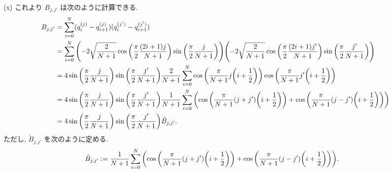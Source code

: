 \documentclass[uplatex,dvipdfmx,a4paper,11pt]{jlreq}
\theoremstyle{definition}
\begin{document}
(x) これより $B_{j,j'}$ は次のように計算できる.
\begin{align}
  B_{j,j'} & = \sum_{i=0}^{N}(q_i^{(j)} - q_{i+1}^{(j)})(q_i^{(j')} - q_{i+1}^{(j')})                                                                                                                                                               \\
           & = \sum_{i=0}^{N}\qty(-2\sqrt{\frac{2}{N+1}}\cos\qty(\frac{\pi}{2}\frac{(2i+1)j}{N+1})\sin\qty(\frac{\pi}{2}\frac{j}{N+1}))\qty(-2\sqrt{\frac{2}{N+1}}\cos\qty(\frac{\pi}{2}\frac{(2i+1)j'}{N+1})\sin\qty(\frac{\pi}{2}\frac{j'}{N+1})) \\
           & = 4\sin\qty(\frac{\pi}{2}\frac{j}{N+1})\sin\qty(\frac{\pi}{2}\frac{j'}{N+1})\frac{2}{N+1}\sum_{i=0}^{N}\cos\qty(\frac{\pi}{N+1}j\qty(i + \frac{1}{2}))\cos\qty(\frac{\pi}{N+1}j'\qty(i + \frac{1}{2}))                                 \\
           & = 4\sin\qty(\frac{\pi}{2}\frac{j}{N+1})\sin\qty(\frac{\pi}{2}\frac{j'}{N+1})\frac{1}{N+1}\sum_{i=0}^{N}\qty(\cos\qty(\frac{\pi}{N+1}(j + j')\qty(i + \frac{1}{2})) + \cos\qty(\frac{\pi}{N+1}(j - j')\qty(i + \frac{1}{2})))           \\
           & = 4\sin\qty(\frac{\pi}{2}\frac{j}{N+1})\sin\qty(\frac{\pi}{2}\frac{j'}{N+1})\tilde{B}_{j,j'}.
\end{align}
ただし, $\tilde{B}_{j,j'}$ を次のように定める.
\begin{align}
  \tilde{B}_{j,j'} & := \frac{1}{N+1}\sum_{i=0}^{N}\qty(\cos\qty(\frac{\pi}{N+1}(j + j')\qty(i + \frac{1}{2})) + \cos\qty(\frac{\pi}{N+1}(j - j')\qty(i + \frac{1}{2}))).
\end{align}
\end{document}
